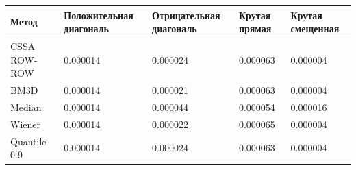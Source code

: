 \begin{tabular}{|l|l|l|l|l|}
\hline
Метод & Положительная диагональ & Отрицательная диагональ & Крутая прямая & Крутая смещенная \\
\hline
CSSA ROW-ROW & 0.000014 & 0.000024 & 0.000063 & 0.000004 \\
\hline
BM3D & 0.000014 & 0.000021 & 0.000063 & 0.000004 \\
\hline
Median & 0.000014 & 0.000044 & 0.000054 & 0.000016 \\
\hline
Wiener & 0.000014 & 0.000022 & 0.000065 & 0.000004 \\
\hline
Quantile 0.9 & 0.000014 & 0.000024 & 0.000063 & 0.000004 \\
\hline
\end{tabular}
